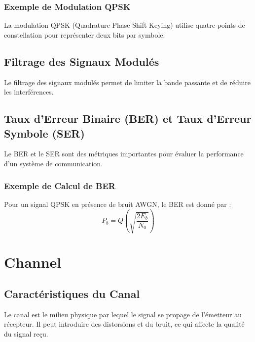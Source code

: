 \documentclass[10pt,a4paper]{article}
\begin{document}
\subsubsection*{Exemple de Modulation QPSK}
La modulation QPSK (Quadrature Phase Shift Keying) utilise quatre points de constellation pour représenter deux bits par symbole.


\subsection*{Filtrage des Signaux Modulés}
Le filtrage des signaux modulés permet de limiter la bande passante et de réduire les interférences.

\subsection*{Taux d'Erreur Binaire (BER) et Taux d'Erreur Symbole (SER)}
Le BER et le SER sont des métriques importantes pour évaluer la performance d'un système de communication.

\subsubsection*{Exemple de Calcul de BER}
Pour un signal QPSK en présence de bruit AWGN, le BER est donné par :
\[ P_b = Q\left(\sqrt{\frac{2E_b}{N_0}}\right) \]

\section*{Channel}

\subsection*{Caractéristiques du Canal}
Le canal est le milieu physique par lequel le signal se propage de l'émetteur au récepteur. Il peut introduire des distorsions et du bruit, ce qui affecte la qualité du signal reçu.
\end{document}
